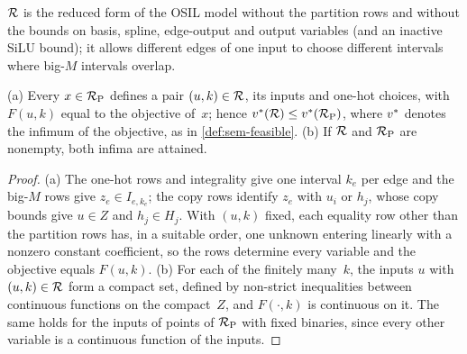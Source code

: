 $\mathcal{R}$ is the reduced form of the OSIL model without the partition rows and without the bounds on basis, spline, edge-output and output variables (and an inactive SiLU bound); it allows different edges of one input to choose different intervals where big-$M$ intervals overlap.

\begin{lemma}[projection]\label{lem:kan-projection}
(a) Every $x\in\mathcal{R}_{\mathrm{P}}$ defines a pair $(u,k)\in\mathcal{R}$, its inputs and one-hot choices, with $F(u,k)$ equal to the objective of~$x$; hence $v^{*}(\mathcal{R})\le v^{*}(\mathcal{R}_{\mathrm{P}})$, where $v^{*}$ denotes the infimum of the objective, as in \cref{def:sem-feasible}.
(b) If $\mathcal{R}$ and $\mathcal{R}_{\mathrm{P}}$ are nonempty, both infima are attained.
\end{lemma}

\begin{proof}
(a) The one-hot rows and integrality give one interval $k_e$ per edge and the big-$M$ rows give $z_e\in I_{e,k_e}$; the copy rows identify $z_e$ with $u_i$ or $h_j$, whose copy bounds give $u\in Z$ and $h_j\in H_j$.
With $(u,k)$ fixed, each equality row other than the partition rows has, in a suitable order, one unknown entering linearly with a nonzero constant coefficient, so the rows determine every variable and the objective equals $F(u,k)$.
(b) For each of the finitely many~$k$, the inputs $u$ with $(u,k)\in\mathcal{R}$ form a compact set, defined by non-strict inequalities between continuous functions on the compact~$Z$, and $F(\cdot,k)$ is continuous on it.
The same holds for the inputs of points of $\mathcal{R}_{\mathrm{P}}$ with fixed binaries, since every other variable is a continuous function of the inputs.
\end{proof}

